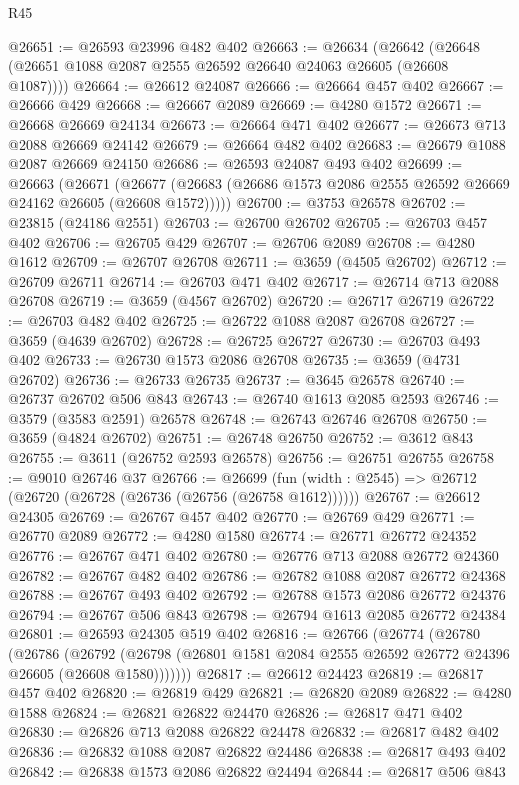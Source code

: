 \begin{lexlean}{R45}
\begin{coremodule}
@26651 := @26593 @23996 @482 @402
@26663 := @26634
    (@26642 (@26648 (@26651 @1088 @2087 @2555 @26592 @26640 @24063 @26605 (@26608 @1087))))
@26664 := @26612 @24087
@26666 := @26664 @457 @402
@26667 := @26666 @429
@26668 := @26667 @2089
@26669 := @4280 @1572
@26671 := @26668 @26669 @24134
@26673 := @26664 @471 @402
@26677 := @26673 @713 @2088 @26669 @24142
@26679 := @26664 @482 @402
@26683 := @26679 @1088 @2087 @26669 @24150
@26686 := @26593 @24087 @493 @402
@26699 := @26663
    (@26671 (@26677 (@26683 (@26686 @1573 @2086 @2555 @26592 @26669 @24162 @26605 (@26608 @1572)))))
@26700 := @3753 @26578
@26702 := @23815 (@24186 @2551)
@26703 := @26700 @26702
@26705 := @26703 @457 @402
@26706 := @26705 @429
@26707 := @26706 @2089
@26708 := @4280 @1612
@26709 := @26707 @26708
@26711 := @3659 (@4505 @26702)
@26712 := @26709 @26711
@26714 := @26703 @471 @402
@26717 := @26714 @713 @2088 @26708
@26719 := @3659 (@4567 @26702)
@26720 := @26717 @26719
@26722 := @26703 @482 @402
@26725 := @26722 @1088 @2087 @26708
@26727 := @3659 (@4639 @26702)
@26728 := @26725 @26727
@26730 := @26703 @493 @402
@26733 := @26730 @1573 @2086 @26708
@26735 := @3659 (@4731 @26702)
@26736 := @26733 @26735
@26737 := @3645 @26578
@26740 := @26737 @26702 @506 @843
@26743 := @26740 @1613 @2085 @2593
@26746 := @3579 (@3583 @2591) @26578
@26748 := @26743 @26746 @26708
@26750 := @3659 (@4824 @26702)
@26751 := @26748 @26750
@26752 := @3612 @843
@26755 := @3611 (@26752 @2593 @26578)
@26756 := @26751 @26755
@26758 := @9010 @26746 @37
@26766 := @26699 (fun (width : @2545) => @26712 (@26720 (@26728 (@26736 (@26756 (@26758 @1612))))))
@26767 := @26612 @24305
@26769 := @26767 @457 @402
@26770 := @26769 @429
@26771 := @26770 @2089
@26772 := @4280 @1580
@26774 := @26771 @26772 @24352
@26776 := @26767 @471 @402
@26780 := @26776 @713 @2088 @26772 @24360
@26782 := @26767 @482 @402
@26786 := @26782 @1088 @2087 @26772 @24368
@26788 := @26767 @493 @402
@26792 := @26788 @1573 @2086 @26772 @24376
@26794 := @26767 @506 @843
@26798 := @26794 @1613 @2085 @26772 @24384
@26801 := @26593 @24305 @519 @402
@26816 := @26766
    (@26774
      (@26780
        (@26786
          (@26792 (@26798 (@26801 @1581 @2084 @2555 @26592 @26772 @24396 @26605 (@26608 @1580)))))))
@26817 := @26612 @24423
@26819 := @26817 @457 @402
@26820 := @26819 @429
@26821 := @26820 @2089
@26822 := @4280 @1588
@26824 := @26821 @26822 @24470
@26826 := @26817 @471 @402
@26830 := @26826 @713 @2088 @26822 @24478
@26832 := @26817 @482 @402
@26836 := @26832 @1088 @2087 @26822 @24486
@26838 := @26817 @493 @402
@26842 := @26838 @1573 @2086 @26822 @24494
@26844 := @26817 @506 @843

\end{coremodule}
\end{lexlean}
